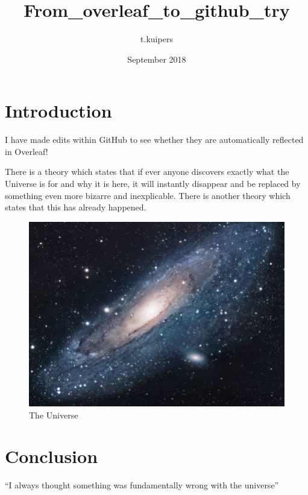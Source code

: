 \documentclass{article}
\title{From_overleaf_to_github_try}
\author{t.kuipers }
\date{September 2018}
\begin{document}
\maketitle

\section{Introduction}
I have made edits within GitHub to see whether they are automatically reflected in Overleaf!


There is a theory which states that if ever anyone discovers exactly what the Universe is for and why it is here, it will instantly disappear and be replaced by something even more bizarre and inexplicable.
There is another theory which states that this has already happened.

\begin{figure}[h!]
\centering
\includegraphics[scale=1.7]{universe}
\caption{The Universe}
\label{fig:universe}
\end{figure}

\section{Conclusion}
``I always thought something was fundamentally wrong with the universe'' \citep{adams1995hitchhiker}



\end{document}
